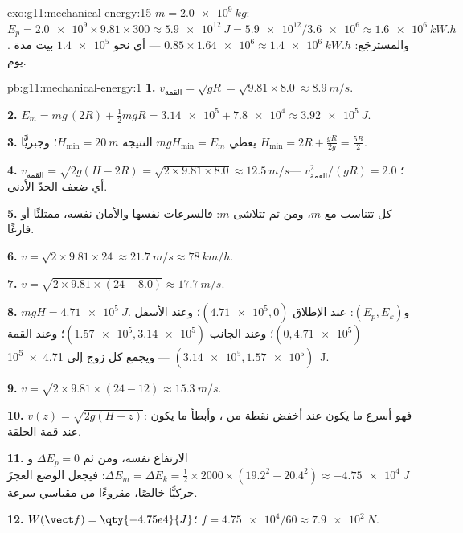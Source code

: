\begin{solution}{exo:g11:mechanical-energy:15}
$m = \qty{2.0e9}{kg}$:
$E_p = \num{2.0e9} \times 9.81 \times 300 \approx \qty{5.9e12}{J}
= \num{5.9e12}/\num{3.6e6} \approx \qty{1.6e6}{kW.h}$. والمسترجَع:
$0.85 \times \num{1.64e6} \approx \qty{1.4e6}{kW.h}$ --- أي نحو
$\num{1.4e5}$ بيت مدة يوم.
\end{solution}

\begin{solution}{pb:g11:mechanical-energy:1}
\textbf{1.} $v_{\text{القمة}} = \sqrt{gR} = \sqrt{9.81 \times 8.0}
\approx \qty{8.9}{m/s}$.

\textbf{2.} $E_m = mg\,(2R) + \tfrac12 m gR = \num{3.14e5} +
\num{7.8e4} \approx \qty{3.92e5}{J}$.

\textbf{3.} يعطي $mgH_{\min} = E_m$ النتيجة $H_{\min} = \qty{20}{m}$؛
وجبريًّا $H_{\min} = 2R + \frac{gR}{2g} = \frac{5R}{2}$.

\textbf{4.} $v_{\text{القمة}} = \sqrt{2g(H - 2R)} =
\sqrt{2 \times 9.81 \times 8.0} \approx \qty{12.5}{m/s}$؛
$v_{\text{القمة}}^2/(gR) = 2.0$ --- أي ضعف الحدّ الأدنى.

\textbf{5.} كل  تتناسب مع $m$، ومن ثم تتلاشى $m$: فالسرعات نفسها
والأمان نفسه، ممتلئًا أو فارغًا.

\textbf{6.} $v = \sqrt{2 \times 9.81 \times 24} \approx \qty{21.7}{m/s}
\approx \qty{78}{km/h}$.

\textbf{7.} $v = \sqrt{2 \times 9.81 \times (24 - 8.0)} \approx
\qty{17.7}{m/s}$.

\textbf{8.} $mgH = \qty{4.71e5}{J}$. و$(E_p, E_k)$: عند الإطلاق
$(\num{4.71e5}, 0)$؛ وعند الأسفل $(0, \num{4.71e5})$؛ وعند الجانب
$(\num{1.57e5}, \num{3.14e5})$؛ وعند القمة $(\num{3.14e5}, \num{1.57e5})$ ---
ويجمع كل زوج إلى \qty{4.71e5}{J}.

\textbf{9.} $v = \sqrt{2 \times 9.81 \times (24 - 12)} \approx
\qty{15.3}{m/s}$.

\textbf{10.} $v(z) = \sqrt{2g(H - z)}$: فهو أسرع ما يكون عند أخفض نقطة من
، وأبطأ ما يكون عند قمة الحلقة.

\textbf{11.} الارتفاع نفسه، ومن ثم $\Delta E_p = 0$ و
$\Delta E_m = \Delta E_k = \tfrac12 \times 2000 \times (19.2^2 -
20.4^2) \approx \qty{-4.75e4}{J}$: فيجعل الوضع العجزَ حركيًّا
خالصًا، مقروءًا من مقياسي سرعة.

\textbf{12.} $W(\vect f) = \qty{-4.75e4}{J}$؛
$f = \num{4.75e4}/60 \approx \qty{7.9e2}{N}$.


\end{solution}
